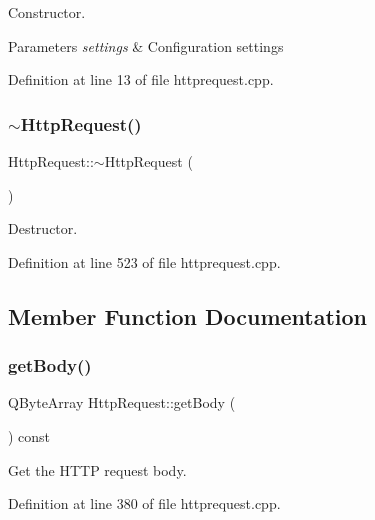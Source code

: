 Constructor. 
\begin{DoxyParams}{Parameters}
{\em settings} & Configuration settings \\
\hline
\end{DoxyParams}


Definition at line 13 of file httprequest.\+cpp.

\mbox{\label{classstefanfrings_1_1_http_request_adfc7ae561e6ba03d21890ee1855df72b}} 
\subsubsection{\texorpdfstring{$\sim$\+Http\+Request()}{~HttpRequest()}}
{\footnotesize\ttfamily Http\+Request\+::$\sim$\+Http\+Request (\begin{DoxyParamCaption}{ }\end{DoxyParamCaption})\hspace{0.3cm}{\ttfamily [virtual]}}

Destructor. 

Definition at line 523 of file httprequest.\+cpp.



\subsection{Member Function Documentation}
\mbox{\label{classstefanfrings_1_1_http_request_abbeb8becf2709b15be3096bcd3b85181}} 
\subsubsection{\texorpdfstring{get\+Body()}{getBody()}}
{\footnotesize\ttfamily Q\+Byte\+Array Http\+Request\+::get\+Body (\begin{DoxyParamCaption}{ }\end{DoxyParamCaption}) const}

Get the H\+T\+TP request body. 

Definition at line 380 of file httprequest.\+cpp.

